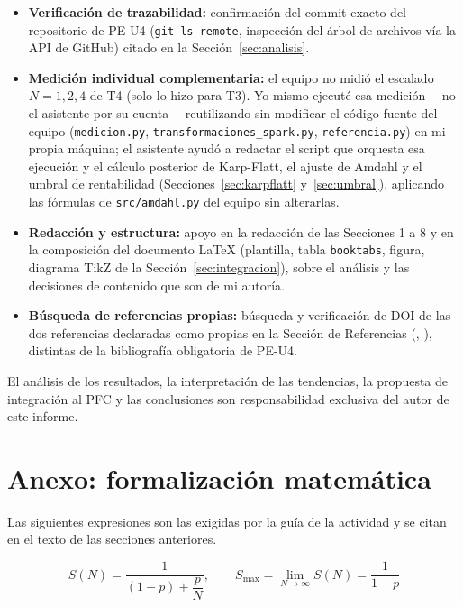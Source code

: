 \documentclass[11pt,a4paper]{article}
\begin{document}
\begin{itemize}
\item \textbf{Verificación de trazabilidad:} confirmación del commit exacto del repositorio de
PE-U4 (\texttt{git ls-remote}, inspección del árbol de archivos vía la API de GitHub) citado en
la Sección~\ref{sec:analisis}.
\item \textbf{Medición individual complementaria:} el equipo no midió el escalado \(N=1,2,4\) de
T4 (solo lo hizo para T3). Yo mismo ejecuté esa medición ---no el asistente por su cuenta---
reutilizando sin modificar el código fuente del equipo (\texttt{medicion.py},
\texttt{transformaciones\_spark.py}, \texttt{referencia.py}) en mi propia máquina; el asistente
ayudó a redactar el script que orquesta esa ejecución y el cálculo posterior de Karp-Flatt, el
ajuste de Amdahl y el umbral de rentabilidad (Secciones~\ref{sec:karpflatt}
y~\ref{sec:umbral}), aplicando las fórmulas de \texttt{src/amdahl.py} del equipo sin alterarlas.
\item \textbf{Redacción y estructura:} apoyo en la redacción de las Secciones 1 a 8 y en la
composición del documento \LaTeX{} (plantilla, tabla \texttt{booktabs}, figura, diagrama TikZ de
la Sección~\ref{sec:integracion}), sobre el análisis y las decisiones de contenido que son de mi
autoría.
\item \textbf{Búsqueda de referencias propias:} búsqueda y verificación de DOI de las dos
referencias declaradas como propias en la Sección de Referencias
(\cite{duenner2017understanding}, \cite{shojaeerad2024serverless}), distintas de la bibliografía
obligatoria de PE-U4.
\end{itemize}

El análisis de los resultados, la interpretación de las tendencias, la propuesta de integración
al PFC y las conclusiones son responsabilidad exclusiva del autor de este informe.

\section*{Anexo: formalización matemática}

Las siguientes expresiones son las exigidas por la guía de la actividad y se citan en el texto
de las secciones anteriores.

\begin{equation}
S(N) = \frac{1}{(1-p)+\dfrac{p}{N}}, \qquad S_{\max} = \lim_{N\to\infty} S(N) = \frac{1}{1-p}
\label{eq:amdahl}
\end{equation}
\end{document}
